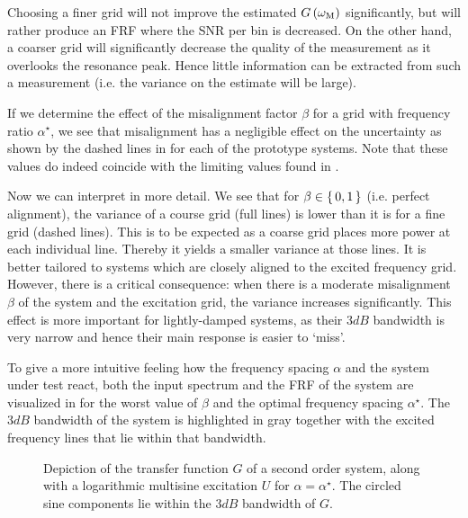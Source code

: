   Choosing a finer grid will not improve the estimated $G\left( \omega_{\mathrm{M}} \right)$ significantly, but will rather produce an \gls{FRF} where the \gls{SNR} per bin is decreased.
  On the other hand, a coarser grid will significantly decrease the quality of the measurement as it overlooks the resonance peak.
  Hence little information can be extracted from such a measurement (i.e. the variance on the estimate will be large).

  If we determine the effect of the misalignment factor $\beta$ for a grid with frequency ratio $\alpha^{\star}$, we see that misalignment has a negligible effect on the uncertainty as shown by the dashed lines in  for each of the prototype systems.
  Note that these values do indeed coincide with the limiting values found in .
  
  Now we can interpret  in more detail.
  We see that for $\beta \in \set{0,1}$ (i.e. perfect alignment), the variance of a course grid (full lines) is lower than it is for a fine grid (dashed lines).
  This is to be expected as a coarse grid places more power at each individual line.
  Thereby it yields a smaller variance at those lines.
  It is better tailored to systems which are closely aligned to the excited frequency grid.
  However, there is a critical consequence: when there is a moderate misalignment $\beta$ of the system and the excitation grid, the variance increases significantly.
  This effect is more important for lightly-damped systems, as their $3\unit{dB}$ bandwidth is very narrow and hence their main response is easier to `miss'.

  To give a more intuitive feeling how the frequency spacing $\alpha$ and the system under test react, both the input spectrum and the \gls{FRF} of the system are visualized in  for the worst value of $\beta$ and the optimal frequency spacing $\alpha^{\star}$.
  The $3\unit{dB}$ bandwidth of the system is highlighted in gray together with the excited frequency lines that lie within that bandwidth.

  \begin{figure}%
    \centering
      \setlength{}
      \setlength\figureheight{0.68\figurewidth}
    
    \caption[System with highlighted bandwidth and multisine components.]{Depiction of the transfer function $G$ of a second order system, along with a logarithmic multisine excitation $U$ for $\alpha = \alpha^{\star}$. The circled sine components lie within the $3 \unit{dB}$ bandwidth of $G$.}%
    \label{fig:excitation:signalAndSystem}
  \end{figure}

